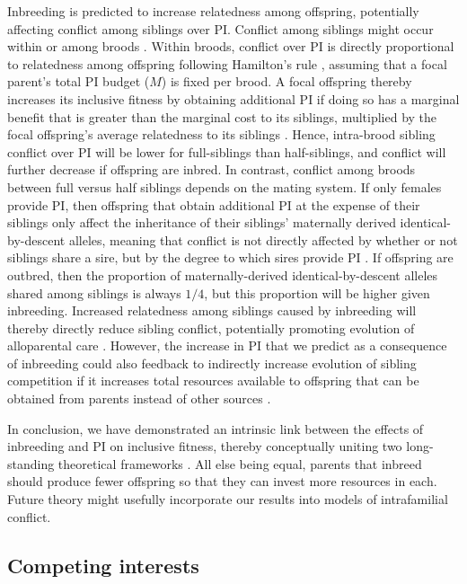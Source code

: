 \documentclass[12pt]{article}
\begin{document}
Inbreeding is predicted to increase relatedness among offspring, potentially affecting conflict among siblings over PI. Conflict among siblings might occur within or among broods \cite{Parker2002, Bonisoli-Alquati2011, Ruch2014}. Within broods, conflict over PI is directly proportional to relatedness among offspring following Hamilton's rule \cite{Hamilton1964, Hamilton1964a}, assuming that a focal parent's total PI budget ($M$) is fixed per brood. A focal offspring thereby increases its inclusive fitness by obtaining additional PI if doing so has a marginal benefit that is greater than the marginal cost to its siblings, multiplied by the focal offspring's average relatedness to its siblings \cite{Parker2002}. Hence, intra-brood sibling conflict over PI will be lower for full-siblings than half-siblings, and conflict will further decrease if offspring are inbred. In contrast, conflict among broods between full versus half siblings depends on the mating system. If only females provide PI, then offspring that obtain additional PI at the expense of their siblings only affect the inheritance of their siblings' maternally derived identical-by-descent alleles, meaning that conflict is not directly affected by whether or not siblings share a sire, but by the degree to which sires provide PI \cite{Lessells1999, Parker2002}. If offspring are outbred, then the proportion of maternally-derived identical-by-descent alleles shared among siblings is always $1/4$, but this proportion will be higher given inbreeding. Increased relatedness among siblings caused by inbreeding will thereby directly reduce sibling conflict, potentially promoting evolution of alloparental care \cite{Davies2016}. However, the increase in PI that we predict as a consequence of inbreeding could also feedback to indirectly increase evolution of sibling competition if it increases total resources available to offspring that can be obtained from parents instead of other sources \cite{Gardner2011a}.

In conclusion, we have demonstrated an intrinsic link between the effects of inbreeding and PI on inclusive fitness, thereby conceptually uniting two long-standing theoretical frameworks \cite[][]{Parker1979, Parker2006, Macnair1978, Parker1978}. All else being equal, parents that inbreed should produce fewer offspring so that they can invest more resources in each. Future theory might usefully incorporate our results into models of intrafamilial conflict.

\subsection*{Competing interests}
\end{document}
